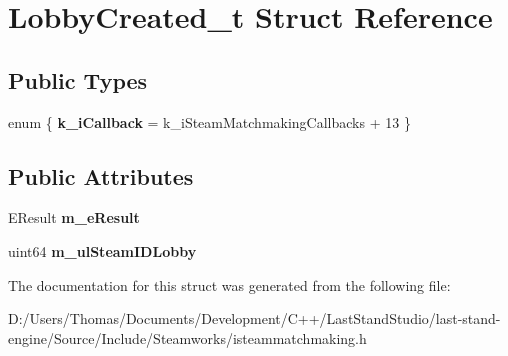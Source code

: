 \hypertarget{structLobbyCreated__t}{}\section{Lobby\+Created\+\_\+t Struct Reference}
\label{structLobbyCreated__t}
\subsection*{Public Types}
\begin{DoxyCompactItemize}
\item 
\hypertarget{structLobbyCreated__t_ae5dc2e787b809d17e46f353dcd565e6d}{}enum \{ {\bfseries k\+\_\+i\+Callback} = k\+\_\+i\+Steam\+Matchmaking\+Callbacks + 13
 \}\label{structLobbyCreated__t_ae5dc2e787b809d17e46f353dcd565e6d}

\end{DoxyCompactItemize}
\subsection*{Public Attributes}
\begin{DoxyCompactItemize}
\item 
\hypertarget{structLobbyCreated__t_aaac5ebc0c5ec4b5380035a69260d1038}{}E\+Result {\bfseries m\+\_\+e\+Result}\label{structLobbyCreated__t_aaac5ebc0c5ec4b5380035a69260d1038}

\item 
\hypertarget{structLobbyCreated__t_a25431678732719c0824abf477bb628ce}{}uint64 {\bfseries m\+\_\+ul\+Steam\+I\+D\+Lobby}\label{structLobbyCreated__t_a25431678732719c0824abf477bb628ce}

\end{DoxyCompactItemize}


The documentation for this struct was generated from the following file\+:\begin{DoxyCompactItemize}
\item 
D\+:/\+Users/\+Thomas/\+Documents/\+Development/\+C++/\+Last\+Stand\+Studio/last-\/stand-\/engine/\+Source/\+Include/\+Steamworks/isteammatchmaking.\+h\end{DoxyCompactItemize}
